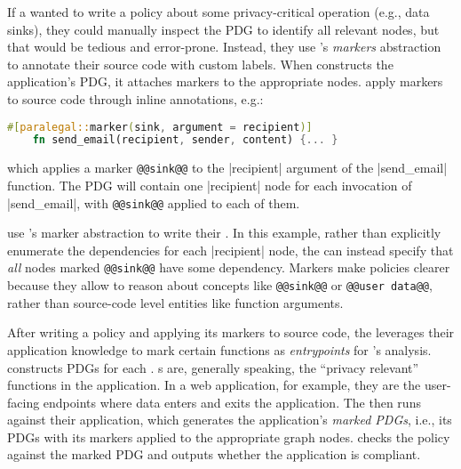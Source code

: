 If a \ce{} wanted to write a policy about some privacy-critical operation
(e.g., data sinks), they could manually inspect the PDG to identify all relevant nodes, 
but that would be tedious and error-prone.
%
Instead, they use \sys's \emph{markers} abstraction to annotate their source code with custom labels.
%
When \sys{} constructs the application's PDG, it attaches markers to the appropriate nodes.
%
\Devs{} apply markers to source code through inline annotations, e.g.:
\begin{lstlisting}[language=Rust]
    #[paralegal::marker(sink, argument = recipient)]
    fn send_email(recipient, sender, content) {... }
\end{lstlisting}
which applies a marker \lstinline[language=CNL]|@@sink@@| to the |recipient| argument of the |send_email| function.
%
The PDG will contain one |recipient| node for each invocation of |send_email|, with \lstinline[language=CNL]|@@sink@@| applied to each of them.

\Writers{} use \sys{}'s marker abstraction to write their \policies{}.
%
In this example, rather than explicitly enumerate the dependencies for each |recipient| node,
the \writer{} can instead specify that \emph{all} nodes marked \lstinline[language=CNL]|@@sink@@| have some dependency.
%
Markers make policies clearer because they allow \writers{} to reason about concepts like 
\lstinline[language=CNL]|@@sink@@| or \lstinline[language=CNL]|@@user data@@|,
rather than source-code level entities like function arguments.
%

After writing a policy and applying its markers to source code,
the \dev{} leverages their application knowledge to mark certain functions 
as \emph{entrypoints} for \sys{}'s analysis.
%
\sys{} constructs PDGs for each \controller{}.
%
\Controller{}s are, generally speaking, the ``privacy relevant'' functions in the application.
%
In a web application, for example, they are the user-facing endpoints where data enters and exits the application.
%
The \dev{} then runs \sys{} against their application, which generates the application's \emph{marked PDGs},
i.e., its PDGs with its markers applied to the appropriate graph nodes.
%
\sys{} checks the policy against the marked PDG and outputs whether the application is compliant.
